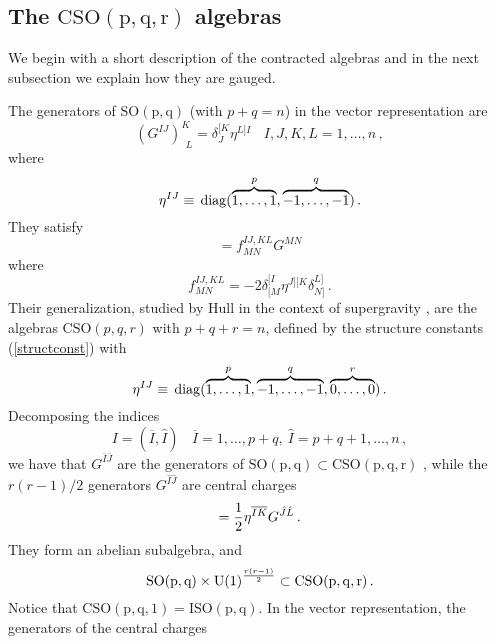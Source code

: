 \documentclass[a4paper,12pt]{article}
\def\bar{\overline}\end {picture}}
\begin{document}
\subsection{The $\mathrm{CSO}\mathrm{(p,q,r)}$ algebras}
We begin with a short description of the contracted algebras and
in the next subsection we explain how they are gauged.
\par
The generators of $\mathrm{SO(p,q)}$ (with $p+q=n$) in the vector
representation are
\begin{equation}
(G^{IJ})^K_{~~L}=\delta^{[K}_J\eta^{L]I}~~~~I,J,K,L=1,\dots,n\,,
\end{equation}
where
\begin{equation}
\eta^{IJ}\equiv\,{\rm
diag}(\overbrace{1,\dots,1}^p,\overbrace{-1,\dots,-1}^q)\,.
\end{equation}
They satisfy
\begin{equation}
[G^{IJ},G^{KL}]=f^{IJ,KL}_{MN}G^{MN}
\end{equation}
where
\begin{equation}
\label{structconst}
f^{IJ,KL}_{MN}=-2\delta^{[I}_{[M}\eta^{J][K}\delta^{L]}_{N]}\,.
\end{equation}
Their generalization, studied by Hull in the context of
supergravity \cite{hull},\cite{hull2} are the algebras
$\mathrm{CSO}(p,q,\!r)$ with $p+q+r=n$, defined by the structure
constants (\ref{structconst}) with
\begin{equation}
\eta^{IJ}\equiv\,{\rm
diag}(\overbrace{1,\dots,1}^p,\overbrace{-1,\dots,-1}^q,
\overbrace{0,\dots,0}^r)\,. \label{metriccpqr}
\end{equation}
Decomposing the indices
\begin{equation}
I=(\bar{I},\hat{I})~~~~\bar{I}=1,\dots,p+q,~\hat{I}=p+q+1,\dots,n\,,
\end{equation}
we have that $G^{\bar{I}\bar{J}}$ are the generators of
$\mathrm{SO(p,q)}\subset \mathrm{CSO}\mathrm{(p,q,r)}$ , while the
$r(r-1)/2$ generators $G^{\hat{I}\hat{J}}$ are central charges
\begin{equation}
[G^{\bar{I}\hat{J}},G^{\bar{K}\hat{L}}]={1\over
2}\eta^{\bar{I}\bar{K}} G^{\hat{J}\hat{L}}\,. \label{nonnull}
\end{equation}
They form an abelian subalgebra, and
\begin{equation}
\mathrm{SO(p,q)}\times \mathrm{U(1)}^{r\left(r-1\right)\over
2}\subset \mathrm{CSO(p,q,r)}\,.
\end{equation}
Notice that $\mathrm{\mathrm{CSO}(p,q,1)}=\mathrm{ISO(p,q)}$. In
the vector representation, the generators of the central charges
\end{document}

